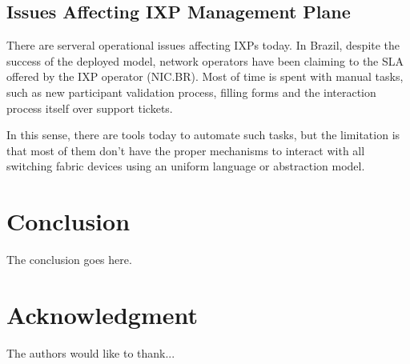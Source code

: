 \documentclass[conference]{IEEEtran/IEEEtran}
\begin{document}
\subsection{Issues Affecting IXP Management Plane}
There are serveral operational issues affecting IXPs today. In Brazil, despite the success of the deployed model, network operators have been claiming to the SLA offered by the IXP operator (NIC.BR). Most of time is spent with manual tasks, such as new participant validation process, filling forms and the interaction process itself over support tickets.

In this sense, there are tools today to automate such tasks, but the limitation is that most of them don't have the proper mechanisms to interact with all switching fabric devices using an uniform language or abstraction model.


\section{Conclusion}
The conclusion goes here.






\section*{Acknowledgment}


The authors would like to thank...








%
%






\end{document}
